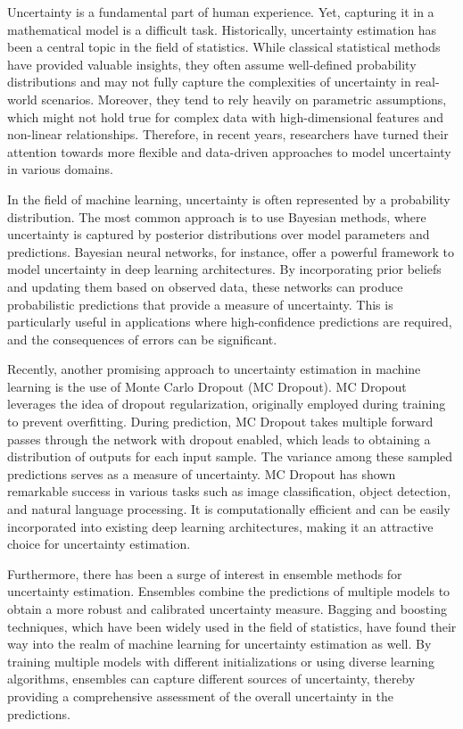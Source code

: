 Uncertainty is a fundamental part of human experience. Yet, capturing it in a mathematical model is a difficult task. Historically, uncertainty estimation has been a central topic in the field of statistics. While classical statistical methods have provided valuable insights, they often assume well-defined probability distributions and may not fully capture the complexities of uncertainty in real-world scenarios. Moreover, they tend to rely heavily on parametric assumptions, which might not hold true for complex data with high-dimensional features and non-linear relationships. Therefore, in recent years, researchers have turned their attention towards more flexible and data-driven approaches to model uncertainty in various domains.

In the field of machine learning, uncertainty is often represented by a probability distribution. The most common approach is to use Bayesian methods, where uncertainty is captured by posterior distributions over model parameters and predictions. Bayesian neural networks, for instance, offer a powerful framework to model uncertainty in deep learning architectures. By incorporating prior beliefs and updating them based on observed data, these networks can produce probabilistic predictions that provide a measure of uncertainty. This is particularly useful in applications where high-confidence predictions are required, and the consequences of errors can be significant.

Recently, another promising approach to uncertainty estimation in machine learning is the use of Monte Carlo Dropout (MC Dropout). MC Dropout leverages the idea of dropout regularization, originally employed during training to prevent overfitting. During prediction, MC Dropout takes multiple forward passes through the network with dropout enabled, which leads to obtaining a distribution of outputs for each input sample. The variance among these sampled predictions serves as a measure of uncertainty. MC Dropout has shown remarkable success in various tasks such as image classification, object detection, and natural language processing. It is computationally efficient and can be easily incorporated into existing deep learning architectures, making it an attractive choice for uncertainty estimation.

Furthermore, there has been a surge of interest in ensemble methods for uncertainty estimation. Ensembles combine the predictions of multiple models to obtain a more robust and calibrated uncertainty measure. Bagging and boosting techniques, which have been widely used in the field of statistics, have found their way into the realm of machine learning for uncertainty estimation as well. By training multiple models with different initializations or using diverse learning algorithms, ensembles can capture different sources of uncertainty, thereby providing a comprehensive assessment of the overall uncertainty in the predictions.

